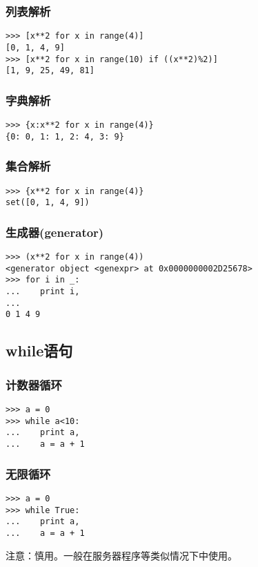 \documentclass[13pt]{beamer}
\begin{document}
\begin{frame}[containsverbatim]
\frametitle{列表解析}
\begin{lstlisting}
>>> [x**2 for x in range(4)]
[0, 1, 4, 9]
>>> [x**2 for x in range(10) if ((x**2)%2)]
[1, 9, 25, 49, 81]
\end{lstlisting}
\end{frame}

\begin{frame}[containsverbatim]
\frametitle{字典解析}
\begin{lstlisting}
>>> {x:x**2 for x in range(4)}
{0: 0, 1: 1, 2: 4, 3: 9}
\end{lstlisting}
\end{frame}

\begin{frame}[containsverbatim]
\frametitle{集合解析}
\begin{lstlisting}
>>> {x**2 for x in range(4)}
set([0, 1, 4, 9])
\end{lstlisting}
\end{frame}

\begin{frame}[containsverbatim]
\frametitle{生成器(generator)}
\begin{lstlisting}
>>> (x**2 for x in range(4))
<generator object <genexpr> at 0x0000000002D25678>
>>> for i in _:
...    print i,
...
0 1 4 9
\end{lstlisting}
\end{frame}

\subsection{while语句}
\begin{frame}[containsverbatim]
\frametitle{计数器循环}
\begin{lstlisting}
>>> a = 0
>>> while a<10:
...    print a,
...    a = a + 1
\end{lstlisting}
\end{frame}

\begin{frame}[containsverbatim]
\frametitle{无限循环}
\begin{lstlisting}
>>> a = 0
>>> while True:
...    print a,
...    a = a + 1
\end{lstlisting}
注意：慎用。一般在服务器程序等类似情况下中使用。
\end{frame}
\end{document}
